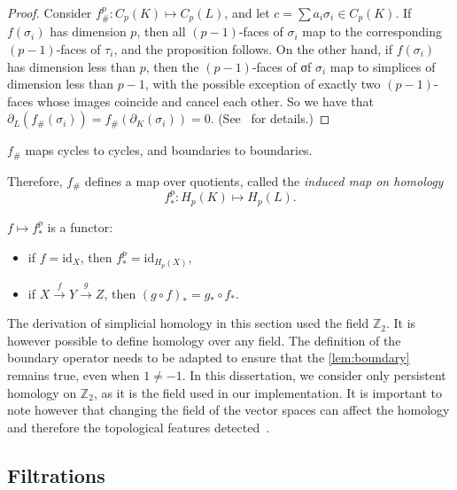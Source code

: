 \documentclass[a4paper,11pt,openany,extrafontsizes]{memoir}
\begin{document}
\begin{proof}
  Consider $f_\#^p : C_p(K) \mapsto C_p(L)$, and let
  $c = \sum a_i \sigma_i \in C_p(K)$. If $f(\sigma_i)$ has dimension
  $p$, then all $(p-1)$-faces of $\sigma_i$ map to the corresponding
  $(p-1)$-faces of $\tau_i$, and the proposition follows. On the other
  hand, if $f(\sigma_i)$ has dimension less than $p$, then the
  $(p−1)$-faces of σf $\sigma_i$ map to simplices of dimension less
  than $p−1$, with the possible exception of exactly two $(p−1)$-faces
  whose images coincide and cancel each other. So we have that
  $\partial_L(f_\#(\sigma_i)) = f_\#(\partial_K(\sigma_i)) =
  0$. (See~\cite{edelsbrunner_computational_2010} for details.)
\end{proof}

\begin{cor}
  $f_\#$ maps cycles to cycles, and boundaries to boundaries.
\end{cor}

Therefore, $f_\#$ defines a map over quotients, called the
\emph{induced map on homology} \[ f_*^p : H_p(K) \mapsto H_p(L). \]

\begin{prop}\label{prop:functor}
  $f \mapsto f_*^p$ is a functor:
  \begin{itemize}
  \item if $f = \mathrm{id}_X$, then $f_*^p = \mathrm{id}_{H_p(X)}$,
  \item if
    $X \overset{f}{\longrightarrow} Y \overset{g}{\longrightarrow} Z$,
    then ${(g \circ f)}_* = g_* \circ f_*$.
  \end{itemize}
\end{prop}


The derivation of simplicial homology in this section used the field
$\mathbb{Z}_2$. It is however possible to define homology over any
field. The definition of the boundary operator needs to be adapted to
ensure that the \autoref{lem:boundary} remains true, even when
$1 \neq -1$. In this dissertation, we consider only persistent
homology on $\mathbb{Z}_2$, as it is the field used in our
implementation. It is important to note however that changing the
field of the vector spaces can affect the homology and therefore the
topological features detected~\cite{zomorodian_computing_2005}.

\subsection{Filtrations}%
\label{sec:filtrations}
\end{document}
